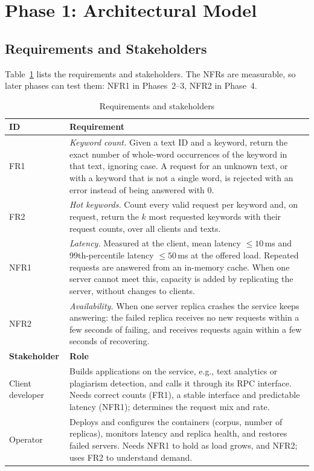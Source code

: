\section{Phase 1: Architectural Model}\label{sec:phase1}

\subsection{Requirements and Stakeholders}
Table~\ref{tab:requirements} lists the requirements and stakeholders. The NFRs
are measurable, so later phases can test them: NFR1 in Phases~2--3, NFR2 in Phase~4.

\begin{table}[t]
\caption{Requirements and stakeholders}
\label{tab:requirements}
\centering
\footnotesize
\begin{tabular}{@{}p{}p{}@{}}
\hline
\textbf{ID} & \textbf{Requirement} \\
\hline
FR1 & \emph{Keyword count.} Given a text ID and a keyword, return the exact
number of whole-word occurrences of the keyword in that text, ignoring case. A
request for an unknown text, or with a keyword that is not a single word, is
rejected with an error instead of being answered with 0. \\
FR2 & \emph{Hot keywords.} Count every valid request per keyword and, on request,
return the $k$ most requested keywords with their request counts, over all
clients and texts. \\
NFR1 & \emph{Latency.} Measured at the client, mean latency $\le 10$\,ms and
99th-percentile latency $\le 50$\,ms at the offered load. Repeated requests are
answered from an in-memory cache. When one server cannot meet this, capacity is
added by replicating the server, without changes to clients. \\
NFR2 & \emph{Availability.} When one server replica crashes the service keeps
answering: the failed replica receives no new requests within a few seconds of
failing, and receives requests again within a few seconds of recovering. \\
\hline
\textbf{Stakeholder} & \textbf{Role} \\
\hline
\raggedright Client developer & Builds applications on the service, e.g., text analytics or
plagiarism detection, and calls it through its RPC interface. Needs correct counts
(FR1), a stable interface and predictable latency (NFR1); determines the request
mix and rate. \\
Operator & Deploys and configures the containers (corpus, number of
replicas), monitors latency and replica health, and restores failed servers.
Needs NFR1 to hold as load grows, and NFR2; uses FR2 to understand demand. \\
\hline
\end{tabular}
\end{table}

